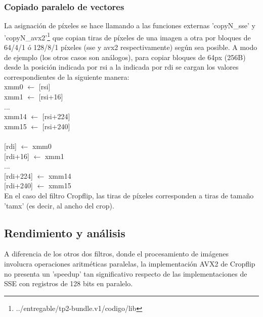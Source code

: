 \subsubsection{Copiado paralelo de vectores}

La asignación de píxeles se hace llamando a las funciones externas 'copyN_sse' y 'copyN_avx2'\footnote{../entregable/tp2-bundle.v1/codigo/lib} que copian tiras de píxeles de una imagen a otra por bloques de 64/4/1 ó 128/8/1 píxeles (sse y avx2 respectivamente) según sea posible. A modo de ejemplo (los otros casos son análogos), para copiar bloques de 64px (256B) desde la posición indicada por rsi a la indicada por rdi se cargan los valores correspondientes de la siguiente manera:
\newline
\\
xmm0 $\leftarrow$ {[rsi]} \\
xmm1 $\leftarrow$ {[rsi+16]} \\
... \\
xmm14 $\leftarrow$ {[rsi+224]}  \\
xmm15 $\leftarrow$ {[rsi+240]} \\
\\
{[rdi]} $\leftarrow$ xmm0 \\
{[rdi+16]} $\leftarrow$ xmm1 \\
... \\
{[rdi+224]} $\leftarrow$ xmm14 \\
{[rdi+240]} $\leftarrow$ xmm15 \\

En el caso del filtro Cropflip, las tiras de píxeles corresponden a tiras de tamaño 'tamx' (es decir, al ancho del crop).  


\subsection{Rendimiento y análisis}

A diferencia de los otros dos filtros, donde el procesamiento de imágenes involucra operaciones aritméticas paralelas, la implementación AVX2 de Cropflip no presenta un 'speedup' tan significativo respecto de las implementaciones de SSE con registros de 128 bits en paralelo.

